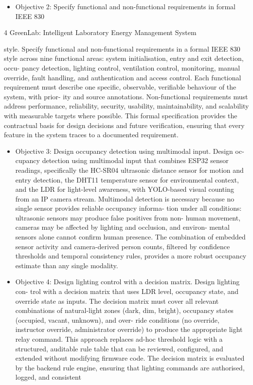 \begin{itemize}
  \item Objective 2: Specify functional and non-functional requirements in formal IEEE 830
\end{itemize}

4
GreenLab: Intelligent Laboratory Energy Management System


style. Specify functional and non-functional requirements in a formal IEEE 830 style
across nine functional areas: system initialisation, entry and exit detection, occu-
pancy detection, lighting control, ventilation control, monitoring, manual override,
fault handling, and authentication and access control. Each functional requirement
must describe one speciﬁc, observable, veriﬁable behaviour of the system, with prior-
ity and source annotations. Non-functional requirements must address performance,
reliability, security, usability, maintainability, and scalability with measurable targets
where possible. This formal speciﬁcation provides the contractual basis for design
decisions and future veriﬁcation, ensuring that every feature in the system traces to a
documented requirement.


\begin{itemize}
  \item Objective 3: Design occupancy detection using multimodal input. Design oc-
cupancy detection using multimodal input that combines ESP32 sensor readings,
speciﬁcally the HC-SR04 ultrasonic distance sensor for motion and entry detection,
the DHT11 temperature sensor for environmental context, and the LDR for light-level
awareness, with YOLO-based visual counting from an IP camera stream. Multimodal
detection is necessary because no single sensor provides reliable occupancy informa-
tion under all conditions: ultrasonic sensors may produce false positives from non-
human movement, cameras may be affected by lighting and occlusion, and environ-
mental sensors alone cannot conﬁrm human presence. The combination of embedded
sensor activity and camera-derived person counts, ﬁltered by conﬁdence thresholds
and temporal consistency rules, provides a more robust occupancy estimate than any
single modality.
\end{itemize}


\begin{itemize}
  \item Objective 4: Design lighting control with a decision matrix. Design lighting con-
trol with a decision matrix that uses LDR level, occupancy state, and override state
as inputs. The decision matrix must cover all relevant combinations of natural-light
zones (dark, dim, bright), occupancy states (occupied, vacant, unknown), and over-
ride conditions (no override, instructor override, administrator override) to produce
the appropriate light relay command. This approach replaces ad-hoc threshold logic
with a structured, auditable rule table that can be reviewed, conﬁgured, and extended
without modifying ﬁrmware code. The decision matrix is evaluated by the backend
rule engine, ensuring that lighting commands are authorised, logged, and consistent
\end{itemize}

